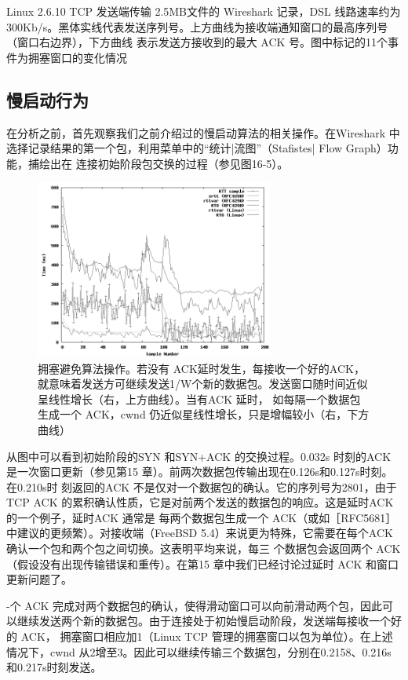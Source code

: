 Linux 2.6.10 TCP 发送端传输 2.5MB文件的 Wireshark 记录，DSL 线路速率约为300Kb/s。黑体实线代表发送序列号。上方曲线为接收端通知窗口的最高序列号（窗口右边界），下方曲线
表示发送方接收到的最大 ACK 号。图中标记的11个事件为拥塞窗口的变化情况

\subsection{慢启动行为}
在分析之前，首先观察我们之前介绍过的慢启动算法的相关操作。在Wireshark 中选择记录结果的第一个包，利用菜单中的“统计|流图”（Stafistes| Flow Graph）功能，捕绘出在
连接初始阶段包交换的过程（参见图16-5）。

\begin{figure}[!htb]
    \centering
	\includegraphics[width=0.7\textwidth]{imgs/14/14-3.png}
	\caption{拥塞避免算法操作。若没有 ACK延时发生，每接收一个好的ACK，就意味着发送方可继续发送1/W个新的数据包。发送窗口随时间近似呈线性增长（右，上方曲线）。当有ACK 延时，
    如每隔一个数据包生成一个 ACK，cwnd 仍近似星线性增长，只是增幅较小（右，下方曲线）}
\end{figure}

从图中可以看到初始阶段的SYN 和SYN+ACK 的交换过程。0.032s 时刻的ACK 是一次窗口更新（参见第15 章）。前两次数据包传输出现在0.126s和0.127s时刻。在0.210s时
刻返回的ACK 不是仅对一个数据包的确认。它的序列号为2801，由于 TCP ACK 的累积确认性质，它是对前两个发送的数据包的响应。这是延时ACK 的一个例子，延时ACK 通常是
每两个数据包生成一个 ACK（或如［RFC5681］ 中建议的更频繁）。对接收端（FreeBSD 5.4）来说更为特殊，它需要在每个ACK 确认一个包和两个包之间切换。这表明平均来说，每三
个数据包会返回两个 ACK（假设没有出现传输错误和重传）。在第15 章中我们已经讨论过延时 ACK 和窗口更新问题了。

-个 ACK 完成对两个数据包的确认，使得滑动窗口可以向前滑动两个包，因此可以继续发送两个新的数据包。由于连接处于初始慢启动阶段，发送端每接收一个好的 ACK，
拥塞窗口相应加1（Linux TCP 管理的拥塞窗口以包为单位）。在上述情况下，cwnd 从2增至3。因此可以继续传输三个数据包，分别在0.2158、0.216s 和0.217s时刻发送。

